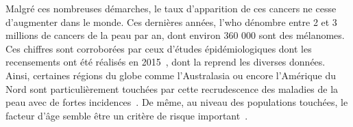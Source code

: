 Malgré ces nombreuses démarches, le taux d’apparition de ces cancers ne cesse d’augmenter dans le monde. Ces dernières années, l'\gls{who} dénombre entre 2 et 3 millions de cancers de la peau par an, dont environ 360 000 sont des mélanomes. Ces chiffres sont corroborées par ceux d'études épidémiologiques dont les recensements ont été réalisés en 2015~\cite{Vos2016}, dont la  reprend les diverses données. Ainsi, certaines régions du globe comme l'Australasia ou encore l'Amérique du Nord sont particulièrement touchées par cette recrudescence des maladies de la peau avec de fortes incidences~\cite{Karimkhani2017}. De même, au niveau des populations touchées, le facteur d'âge semble être un critère de risque important~\cite{Karimkhani2017}.\par 

